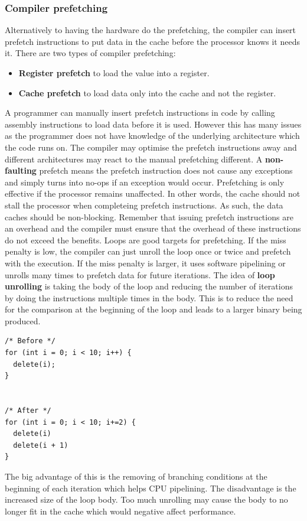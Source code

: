 \documentclass[11pt]{article}
\begin{document}
\subsubsection{Compiler prefetching}
Alternatively to having the hardware do the prefetching, the compiler can insert prefetch instructions to put data in the cache before the processor knows it needs it. There are two types of compiler prefetching:
\begin{itemize}
\item \textbf{Register prefetch} to load the value into a register.
\item \textbf{Cache prefetch} to load data only into the cache and not the register.
\end{itemize}
\noindent
A programmer can manually insert prefetch instructions in code by calling assembly instructions to load data before it is used. However this has many issues as the programmer does not have knowledge of the underlying architecture which the code runs on. The compiler may optimise the prefetch instructions away and different architectures may react to the manual prefetching different.
\n
A \textbf{non-faulting} prefetch means the prefetch instruction does not cause any exceptions and simply turns into no-ops if an exception would occur. Prefetching is only effective if the processor remains unaffected. In other words, the cache should not stall the processor when completeing prefetch instructions. As such, the data caches should be non-blocking. Remember that issuing prefetch instructions are an overhead and the compiler must ensure that the overhead of these instructions do not exceed the benefits.
\n
Loops are good targets for prefetching. If the miss penalty is low, the compiler can just unroll the loop once or twice and prefetch with the execution. If the miss penalty is larger, it uses software pipelining or unrolls many times to prefetch data for future iterations. The idea of \textbf{loop unrolling} is taking the body of the loop and reducing the number of iterations by doing the instructions multiple times in the body. This is to reduce the need for the comparison at the beginning of the loop and leads to a larger binary being produced.
\begin{lstlisting}[caption={Loop unrolling}, captionpos=b]
/* Before */
for (int i = 0; i < 10; i++) {
  delete(i);
}


/* After */
for (int i = 0; i < 10; i+=2) {
  delete(i)
  delete(i + 1)
}
\end{lstlisting}
\noindent
The big advantage of this is the removing of branching conditions at the beginning of each iteration which helps CPU pipelining. The disadvantage is the increased size of the loop body. Too much unrolling may cause the body to no longer fit in the cache which would negative affect performance.
\end{document}
